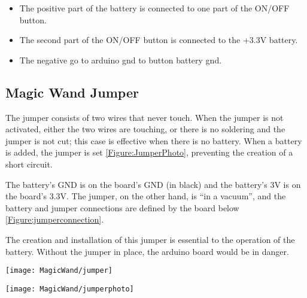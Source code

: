 \begin{itemize}
    \item The positive part of the battery is connected to one part of the ON/OFF button.
    \item The second part of the ON/OFF button is connected to the +3.3V battery. 
    \item The negative go to arduino gnd to button battery gnd. 
\end{itemize}


\subsection{Magic Wand Jumper}

The jumper consists of two wires that never touch. When the jumper is not activated, either the two wires are touching, or there is no soldering and the jumper is not cut; this case is effective when there is no battery. 
When a battery is added, the jumper is set \ref{Figure:JumperPhoto}, preventing the creation of a short circuit.

The battery's GND is on the board's GND (in black) and the battery's 3V is on the board's 3.3V. The jumper, on the other hand, is “in a vacuum”, and the battery and jumper connections are defined by the board below \ref{Figure:jumperconnection}. 

The creation and installation of this jumper is essential to the operation of the battery. Without the jumper in place, the arduino board would be in danger. 
\begin{center}
    \texttt{[image: MagicWand/jumper]}
    \label{Figure:jumperconnection}
    
    \bigskip
    
    \texttt{[image: MagicWand/jumperphoto]}
    \label{Figure:JumperPhoto}
\end{center} 